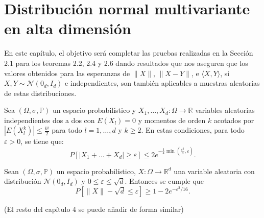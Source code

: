 \chapter{Distribución normal multivariante en alta dimensión}

En este capítulo, el objetivo será completar las pruebas realizadas en la Sección 2.1 para los teoremas 2.2, 2.4 y 2.6 dando resultados que nos aseguren que los valores obtenidos para las esperanzas de $\|X\|$, $\|X - Y\|$, e $\langle X, Y \rangle$, si $X, Y \sim \mathcal{N}(0_d, I_d)$ e independientes, son también aplicables a muestras aleatorias de estas distribuciones.

\begin{lemma}
Sea $\left(\Omega,\sigma,\mathbb{P}\right)$ un espacio probabilístico y $X_1, \dots, X_d : \Omega \to \mathbb{R}$ variables aleatorias independientes dos a dos con $E(X_l) = 0$ y momentos de orden $k$ acotados por $|E(X_l^k)| \leq \frac{k!}{2}$ para todo $l = 1, \dots, d$ y $k \geq 2$. En estas condiciones, para todo $\varepsilon > 0$, se tiene que:
\[ P [ |X_1 + \dots + X_d| \geq \varepsilon ] \leq 2e^{-\frac{1}{4} \min(\frac{\varepsilon^2}{d}, \varepsilon)}. \]
\end{lemma}

\begin{theorem}
Sean $\left(\Omega,\sigma,\mathbb{P}\right)$ un espacio probabilístico, $X : \Omega \to \mathbb{R}^d$ una variable aleatoria con distribución $\mathcal{N}(0_d, I_d)$ y $0 \leq \varepsilon \leq \sqrt{d}$. Entonces se cumple que
\[ P [ \|X\| - \sqrt{d} \leq \varepsilon ] \geq 1 - 2e^{-\varepsilon^2/16}. \]
\end{theorem}

(El resto del capítulo 4 se puede añadir de forma similar)
